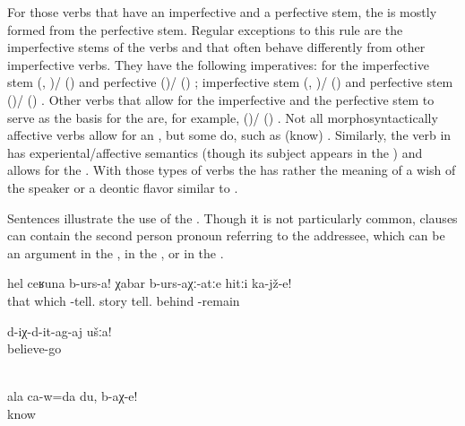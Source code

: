 For those verbs that have an imperfective and a perfective stem, the  is mostly formed from the perfective stem. Regular exceptions to this rule are the imperfective stems of the verbs  and  that often behave differently from other imperfective verbs. They have the following imperatives: for the imperfective stem  (, )\slash{} ()  and perfective  ()\slash{} () ; imperfective stem  (, )\slash{} ()  and perfective stem  ()\slash{} () . Other verbs that allow for the imperfective and the perfective stem to serve as the basis for the  are, for example,  ()\slash{} () . Not all morphosyntactically affective verbs allow for an , but some do, such as  (know) . Similarly, the verb in  has experiental\slash affective semantics (though its subject appears in the ) and allows for the . With those types of verbs the  has rather the meaning of a wish of the speaker or a deontic flavor similar to .

Sentences  illustrate the use of the . Though it is not particularly common,  clauses can contain the second person pronoun referring to the addressee, which can be an argument in the  , in the  , or in the .

\begin{exe}
	\ex	\label{ex:‎Tell it like this}
	\gll	hel	ceʁuna	b-urs-a!	χabar		b-urs-aχː-atːe	hitːi	ka-jž-e!\\
		that	which	-tell.	story	tell.	behind	-remain\\
	\glt	{}

	\ex	\label{ex:You pl believe me}
	\gll	d-iχ-d-it-ag-aj	ušːa!\\
		believe-go	\\
		\\
	\glt	{}

	\ex	\label{ex:I am yours, (you) know}
	\gll	ala	ca-w=da	du,	b-aχ-e!\\
					know\\
	\glt	{}
\end{exe}\largerpage

